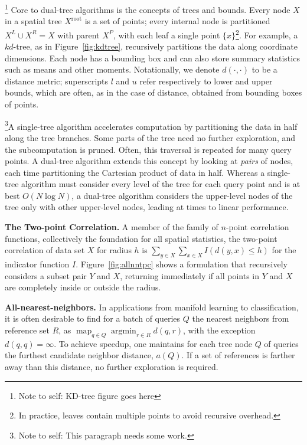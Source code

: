 \documentclass[times, leqno,twocolumn]{article}
\newcommand{\authornote}[1]{\footnote{Note to self: #1}}
\newcommand{\union}{\cup}
\DeclareMathOperator*{\map}{map}
\DeclareMathOperator*{\argmin}{argmin}
\newcommand{\fig}[1]{Figure~\ref{fig:#1}}
\newcommand{\kdroot}[1]{#1^{\text{root}}}
\newcommand{\kdleft}[1]{#1^{\!L}}
\newcommand{\kdright}[1]{#1^{\!R}}
\newcommand{\kdparent}[1]{#1^{\!P}}
\newcommand{\dist}[2]{d(#1,#2)}
\begin{document}
\authornote{KD-tree figure goes here}
Core to dual-tree algorithms is the concepts of trees and bounds.
Every node $X$ in a spatial tree $\kdroot{X}$ is a set of points; every internal node is partitioned $\kdleft{X} \union \kdright{X} = X$ with parent $\kdparent{X}$, with each leaf a single point $\{x\}$\footnote{In practice, leaves contain multiple points to avoid recursive overhead.}.
For example, a $kd$-tree\cite{preparata_kdtrees}, as in \fig{kdtree}, recursively partitions the data along coordinate dimensions.
Each node has a bounding box and can also store summary statistics such as means and other moments.
Notationally, we denote $\dist{\cdot}{\cdot}$ to be a distance metric; superscripts $l$ and $u$ refer respectively to lower and upper bounds, which are often, as in the case of distance, obtained from bounding boxes of points.

\authornote{This paragraph needs some work.}A single-tree algorithm accelerates computation by partitioning the data in half along the tree branches.
Some parts of the tree need no further exploration, and the subcomputation is pruned.
Often, this traversal is repeated for many query points.
A dual-tree algorithm extends this concept by looking at {\it pairs} of nodes, each time partitioning the Cartesian product of data in half.
Whereas a single-tree algorithm must consider every level of the tree for each query point and is at best $O(N \log N)$, a dual-tree algorithm considers the upper-level nodes of the tree only with other upper-level nodes, leading at times to linear performance.

{\bf The Two-point Correlation.} A member of the family of $n$-point correlation functions, collectively the foundation for all spatial statistics, the two-point correlation of data set $X$ for radius $h$ is
$\sum_{y \in X} \sum_{x \in X} I(d(y, x) \leq h)$ for the indicator function $I$.
Figure~\ref{fig:allnntpc} shows a formulation that recursively considers a subset pair $Y$ and $X$, returning immediately if all points in $Y$ and $X$ are completely inside or outside the radius.

{\bf All-nearest-neighbors.} In applications from manifold learning to classification, it is often desirable to find for a batch of queries $Q$ the nearest neighbors from reference set $R$, as $\map_{q \in Q} \argmin_{r \in R} d(q,r)$, with the exception $d(q,q) = \infty$.
To achieve speedup, one maintains for each tree node $Q$ of queries the furthest candidate neighbor distance, $a(Q)$.
If a set of references is farther away than this distance, no further exploration is required.
\end{document}
